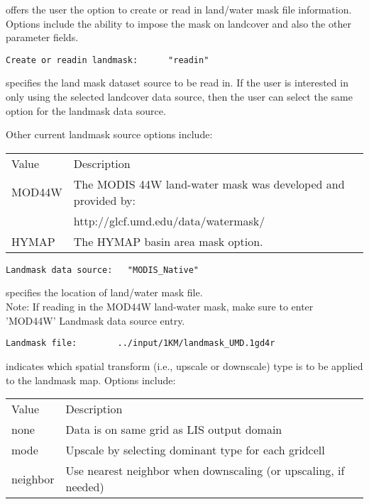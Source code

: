  
  offers the user the option
 to create or read in land/water mask file information.
 Options include the ability to impose the mask on landcover
 and also the other parameter fields.
 

 \begin{Verbatim}[frame=single]
Create or readin landmask:      "readin"
 \end{Verbatim}

 
  specifies the land mask
 dataset source to be read in.  If the user is interested in
 only using the selected landcover data source, then the user 
 can select the same option for the landmask data source.
  
 Other current landmask source options include:

 \begin{tabular}{ll}
 Value     & Description                                           \\
 MOD44W    & The MODIS 44W land-water mask was developed and provided by: \\
           &  http://glcf.umd.edu/data/watermask/ \\
 HYMAP     & The HYMAP basin area mask option. \\
 \end{tabular}
 

 \begin{Verbatim}[frame=single]
Landmask data source:   "MODIS_Native"
 \end{Verbatim}

 
  specifies the location of land/water mask file. \\
 Note: If reading in the MOD44W land-water mask, make sure to enter   
 'MOD44W' Landmask data source entry.
 

 \begin{Verbatim}[frame=single]
Landmask file:        ../input/1KM/landmask_UMD.1gd4r
 \end{Verbatim}

 
  indicates which spatial transform
 (i.e., upscale or downscale) type is to be applied to the landmask
 map.  Options include:

 \begin{tabular}{ll}
 Value     & Description                                           \\
 none      &  Data is on same grid as LIS output domain            \\
 mode      &  Upscale by selecting dominant type for each gridcell \\
 neighbor  &  Use nearest neighbor when downscaling (or upscaling, if needed) \\
 \end{tabular}
 

